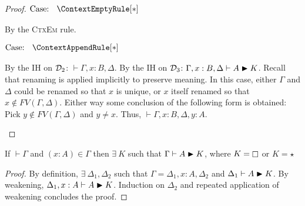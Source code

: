 \begin{proof}
    $\text{Case: }\begin{array}{c} \ContextEmptyRule[*] \end{array}$
    \begin{proofcase}
        By the \textsc{CtxEm} rule.
    \end{proofcase}

    $\text{Case: }\begin{array}{c} \ContextAppendRule[*] \end{array}$
    \begin{proofcase}
        By the IH on $\mathcal{D}_{2}$: $\vdash \Gamma, x : B, \Delta$.
        By the IH on $\mathcal{D}_{3}$: $\Gamma, x : B, \Delta \vdash A \blacktriangleright K$.
        Recall that renaming is applied implicitly to preserve meaning.
        In this case, either $\Gamma$ and $\Delta$ could be renamed so that $x$ is unique, or $x$ itself renamed so that $x \notin FV(\Gamma, \Delta)$.
        Either way some conclusion of the following form is obtained: Pick $y \notin FV(\Gamma, \Delta)$ and $y \neq x$.
        Thus, $\vdash \Gamma, x : B, \Delta, y : A$.
    \end{proofcase}
\end{proof}

\begin{lemma}
    If $\vdash \Gamma$ and $(x : A) \in \Gamma$ then $\exists\ K$ such that $\Gamma \vdash A \blacktriangleright K$, where $K = \kind$ or $K = \star$
    \label{lem:2:ctx_get}
\end{lemma}
\begin{proof}
    By definition, $\exists\ \Delta_1, \Delta_2$ such that $\Gamma = \Delta_1, x : A, \Delta_2$ and $\Delta_1 \vdash A \blacktriangleright K$.
    By weakening, $\Delta_1, x : A \vdash A \blacktriangleright K$.
    Induction on $\Delta_2$ and repeated application of weakening concludes the proof.
\end{proof}

